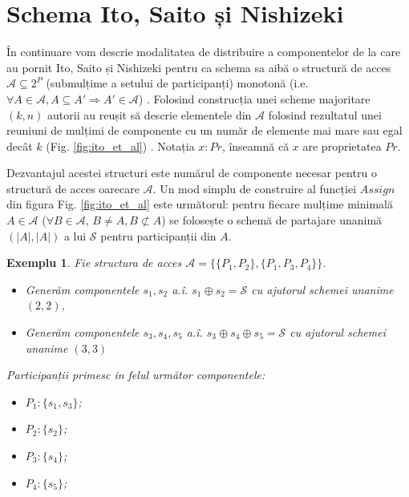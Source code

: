 \documentclass[oneside, 12pt]{book}
\newtheorem{exemplu}{\textbf{Exemplu}}[section]
\begin{document}

\section{Schema Ito, Saito și Nishizeki}
\label{Ito}

În continuare vom descrie modalitatea de distribuire a componentelor de la care au pornit Ito, Saito și Nishizeki pentru ca schema sa aibă o structură de acces $\mathcal{A} \subseteq 2^P$ (submulțime a setului de participanți) monotonă (i.e. $\forall A \in \mathcal{A}, A \subseteq A' \Rightarrow A' \in \mathcal{A}$) \cite{ITO:1989}. 
Folosind construcția unei scheme majoritare $(k, n)$ autorii au reușit să descrie elementele din $\mathcal{A}$ folosind rezultatul unei reuniuni de mulțimi de componente cu un număr de elemente mai mare sau egal decât $k$ (Fig. \ref{fig:ito_et_al}) \cite{ITO:1989}. Notația $x : Pr$, înseamnă că $x$ are proprietatea $Pr$. 

Dezvantajul acestei structuri este numărul de componente necesar pentru o structură de acces oarecare $\mathcal{A}$. Un mod simplu de construire al funcției $Assign$ din figura Fig. \ref{fig:ito_et_al} este următorul: pentru fiecare mulțime minimală $A \in \mathcal{A}$ ($\forall B \in \mathcal{A}$, $B \neq A, B \not\subset A$) se folosește o schemă de partajare unanimă $(|A|, |A|)$ a lui $\mathcal{S}$ pentru participanții din $A$.

\begin{exemplu}
	Fie structura de acces $\mathcal{A} = \{ \{P_1, P_2\},\{P_1, P_3, P_4\}\}$.
	\begin{itemize}
		\item Generăm componentele $s_1, s_2$ a.î. $s_1 \oplus s_2 = \mathcal{S}$ cu ajutorul schemei unanime $(2,2)$, 
		\item Generăm componentele $s_3, s_4, s_5$ a.î. $s_3 \oplus s_4 \oplus s_5 = \mathcal{S}$ cu ajutorul schemei unanime $(3,3)$
	\end{itemize}
	Participanții primesc in felul următor componentele:
	\begin{itemize}
		\item $P_1: \{s_1, s_3\}$;
		\item $P_2: \{s_2\}$;
		\item $P_3: \{s_4\}$;
		\item $P_4: \{s_5\}$;
	\end{itemize}
\end{exemplu}
\end{document}
